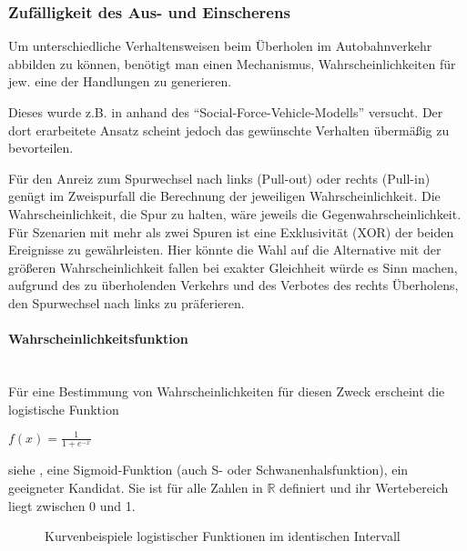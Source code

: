\subsubsection{Zufälligkeit des Aus- und Einscherens}
\label{sec:pullout-pullin}

Um unterschiedliche Verhaltensweisen beim Überholen im Autobahnverkehr abbilden zu können, benötigt man einen Mechanismus, Wahrscheinlichkeiten für jew. eine der Handlungen zu generieren.

Dieses wurde z.B. in \cite{dat-ba} anhand des \enquote{Social-Force-Vehicle-Modells} versucht. 
Der dort erarbeitete Ansatz scheint jedoch das gewünschte Verhalten übermäßig zu bevorteilen.

Für den Anreiz zum Spurwechsel nach links (Pull-out) oder rechts (Pull-in) genügt im Zweispurfall die Berechnung der jeweiligen Wahrscheinlichkeit.
Die Wahrscheinlichkeit, die Spur zu halten, wäre jeweils die Gegenwahrscheinlichkeit.
\\
Für Szenarien mit mehr als zwei Spuren ist eine Exklusivität (XOR) der beiden Ereignisse zu gewährleisten.
Hier könnte die Wahl auf die Alternative mit der größeren Wahrscheinlichkeit fallen bei exakter Gleichheit würde es Sinn machen, aufgrund des zu überholenden Verkehrs und des Verbotes des rechts Überholens, den Spurwechsel nach links zu präferieren.

\paragraph*{Wahrscheinlichkeitsfunktion} 
\hfill \\
Für eine Bestimmung von Wahrscheinlichkeiten für diesen Zweck erscheint die logistische Funktion  
\begin{center}
$ f(x) = \frac{1}{1 + e^{-x}} $ 
\end{center}
siehe \cite{logistic-function}, eine Sigmoid-Funktion (auch S- oder Schwanenhalsfunktion), ein geeigneter Kandidat. 
Sie ist für alle Zahlen in $ \mathbb{R} $ definiert und ihr Wertebereich liegt zwischen 0 und 1.

\begin{figure}[hptb]
  \centering
     \qquad 
  \caption[Kurvenbeispiele der logistischen Funktion]
          {Kurvenbeispiele logistischer Funktionen im identischen Intervall}
  \label{figure:kurve-logistic}
\end{figure}

